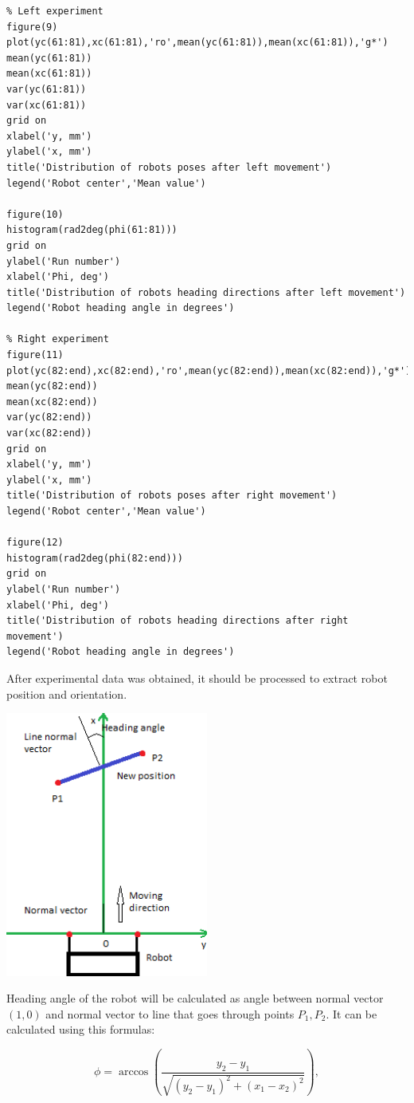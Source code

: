 \documentclass[a4paper, 12pt]{article}
\begin{document}
\begin{lstlisting}
% Left experiment
figure(9)
plot(yc(61:81),xc(61:81),'ro',mean(yc(61:81)),mean(xc(61:81)),'g*')
mean(yc(61:81))
mean(xc(61:81))
var(yc(61:81))
var(xc(61:81))
grid on
xlabel('y, mm')
ylabel('x, mm')
title('Distribution of robots poses after left movement')
legend('Robot center','Mean value')

figure(10)
histogram(rad2deg(phi(61:81)))
grid on
ylabel('Run number')
xlabel('Phi, deg')
title('Distribution of robots heading directions after left movement')
legend('Robot heading angle in degrees')

% Right experiment
figure(11)
plot(yc(82:end),xc(82:end),'ro',mean(yc(82:end)),mean(xc(82:end)),'g*')
mean(yc(82:end))
mean(xc(82:end))
var(yc(82:end))
var(xc(82:end))
grid on
xlabel('y, mm')
ylabel('x, mm')
title('Distribution of robots poses after right movement')
legend('Robot center','Mean value')

figure(12)
histogram(rad2deg(phi(82:end)))
grid on
ylabel('Run number')
xlabel('Phi, deg')
title('Distribution of robots heading directions after right movement')
legend('Robot heading angle in degrees')
\end{lstlisting}



\newpage
After experimental data was obtained, it should be processed to extract robot position and orientation.
\begin{center}
\includegraphics[width=0.5\textwidth]{frame}
\end{center}
Heading angle of the robot will be calculated as angle between normal vector $(1,0)$ and normal vector to line that goes through points $P_1,P_2.$ It can be calculated using this formulas:

\begin{equation}
\phi = \arccos(\frac{y_2-y_1}{\sqrt{(y_2-y_1)^2+(x_1-x_2)^2}}),
\end{equation}
\end{document}
